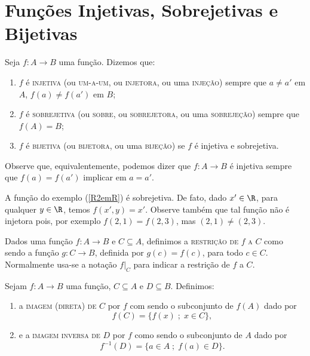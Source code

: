 \documentclass{article}
\begin{document}
\section{Fun\c{c}\~oes Injetivas, Sobrejetivas e Bijetivas}

\begin{definition}
Seja $f:A \rightarrow B$ uma fun\c{c}\~ao. Dizemos que:
\begin{enumerate}
    \item $f$ \'e \textsc{injetiva} (ou \textsc{um-a-um}, ou \textsc{injetora}, ou uma
    \textsc{inje\c{c}\~ao}) sempre que $a \neq a'$ em $A$, $f(a)\neq
    f(a')$ em $B$;
    \item $f$ \'e \textsc{sobrejetiva} (ou \textsc{sobre}, ou \textsc{sobrejetora}, ou uma
    \textsc{sobreje\c{c}\~ao}) sempre que $f(A)=B$;
    \item $f$ \'e  \textsc{bijetiva} (ou \textsc{bijetora}, ou uma \textsc{bije\c{c}\~ao}) se $f$
    \'e injetiva e sobrejetiva.
\end{enumerate}
\end{definition}

Observe que, equivalentemente, podemos dizer que $f:A \rightarrow
B$ \'e injetiva sempre que $f(a)=f(a')$ implicar em $a=a'$.

\begin{example}
A fun\c{c}\~ao do exemplo (\ref{R2emR}) \'e sobrejetiva. De fato, dado $x'
\in \R$, para qualquer $y \in \R$, temos $f(x',y)=x'$. Observe
tamb\'em que tal fun\c{c}\~ao n\~ao \'e injetora pois, por exemplo
$f(2,1)=f(2,3)$, mas $(2,1)\neq (2,3)$.
\end{example}
\begin{definition}
Dados uma fun\c{c}\~ao $f:A \rightarrow B$ e $C\subseteq A$, definimos a
\textsc{restri\c{c}\~ao de} $f$ \textsc{a} $C$ como sendo a fun\c{c}\~ao $g:C
\rightarrow B$, definida por $g(c)=f(c)$, para todo $c \in C$.
Normalmente usa-se a nota\c{c}\~ao $f|_C$ para indicar a restri\c{c}\~ao de
$f$ a $C$.
\end{definition}
\begin{definition}
Sejam $f:A \rightarrow B$ uma fun\c{c}\~ao, $C \subseteq A$ e $D
\subseteq B$. Definimos:
\begin{enumerate}
    \item a \textsc{imagem (direta) de} $C$ por $f$ com sendo o subconjunto
    de $f(A)$ dado por
    $$
     f(C)=\{f(x)\;;\; x \in C \},
    $$
    \item  e a \textsc{imagem inversa de} $D$ por $f$ como sendo o subconjunto
    de $A$ dado por
    $$
    f^{-1}(D)=\{a \in A\;;\; f(a) \in D \}.
    $$
\end{enumerate}
\end{definition}
\end{document}
